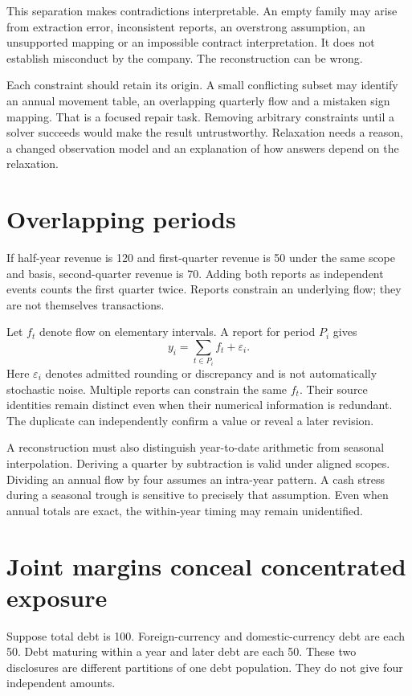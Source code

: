 This separation makes contradictions interpretable. An empty family may arise from extraction error, inconsistent reports, an overstrong assumption, an unsupported mapping or an impossible contract interpretation. It does not establish misconduct by the company. The reconstruction can be wrong.

Each constraint should retain its origin. A small conflicting subset may identify an annual movement table, an overlapping quarterly flow and a mistaken sign mapping. That is a focused repair task. Removing arbitrary constraints until a solver succeeds would make the result untrustworthy. Relaxation needs a reason, a changed observation model and an explanation of how answers depend on the relaxation.

\section{Overlapping periods}
If half-year revenue is 120 and first-quarter revenue is 50 under the same scope and basis, second-quarter revenue is 70. Adding both reports as independent events counts the first quarter twice. Reports constrain an underlying flow; they are not themselves transactions.

Let $f_t$ denote flow on elementary intervals. A report for period $P_i$ gives
\begin{equation}
 y_i=\sum_{t\in P_i}f_t+\varepsilon_i.
\end{equation}
Here $\varepsilon_i$ denotes admitted rounding or discrepancy and is not automatically stochastic noise. Multiple reports can constrain the same $f_t$. Their source identities remain distinct even when their numerical information is redundant. The duplicate can independently confirm a value or reveal a later revision.

A reconstruction must also distinguish year-to-date arithmetic from seasonal interpolation. Deriving a quarter by subtraction is valid under aligned scopes. Dividing an annual flow by four assumes an intra-year pattern. A cash stress during a seasonal trough is sensitive to precisely that assumption. Even when annual totals are exact, the within-year timing may remain unidentified.

\section{Joint margins conceal concentrated exposure}
Suppose total debt is 100. Foreign-currency and domestic-currency debt are each 50. Debt maturing within a year and later debt are each 50. These two disclosures are different partitions of one debt population. They do not give four independent amounts.

